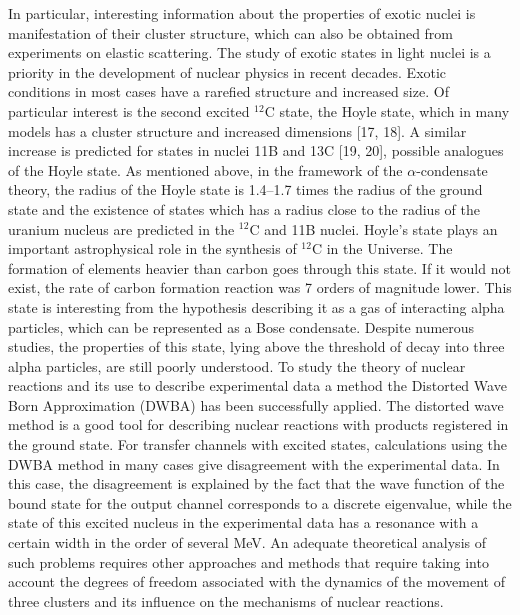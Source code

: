 \documentclass[
12pt, %
oneside, %
english, %
onehalfspacing, %
onehalfspacing, %
headsepline, %
]{MastersDoctoralThesis} %
\begin{document}
In particular, interesting information about the properties of exotic nuclei is manifestation of their cluster structure, which can also be obtained from experiments on elastic scattering. The study of exotic states in light nuclei is a priority in the development of nuclear physics in recent decades. Exotic conditions in most cases have a rarefied structure and increased size. Of particular interest is the second excited $^{12}$C state, the Hoyle state, which in many models has a cluster structure and increased dimensions [17, 18]. A similar increase is predicted for states in nuclei 11B and 13C [19, 20], possible analogues of the Hoyle state. As mentioned above, in the framework of the $\alpha$-condensate theory, the radius of the Hoyle state is 1.4–1.7 times the radius of the ground state and the existence of states which has a radius close to the radius of the uranium nucleus are predicted in the $^{12}$C and 11B nuclei.
Hoyle's state plays an important astrophysical role in the synthesis of $^{12}$C in the Universe. The formation of elements heavier than carbon goes through this state. If it would not exist, the rate of carbon formation reaction was 7 orders of magnitude lower. This state is interesting from the hypothesis describing it as a gas of interacting alpha particles, which can be represented as a Bose condensate. Despite numerous studies, the properties of this state, lying above the threshold of decay into three alpha particles, are still poorly understood.
To study the theory of nuclear reactions and its use to describe experimental data a method the Distorted Wave Born Approximation (DWBA) has been successfully applied. The distorted wave method is a good tool for describing nuclear reactions with products registered in the ground state. For transfer channels with excited states, calculations using the DWBA method in many cases give disagreement with the experimental data. In this case, the disagreement is explained by the fact that the wave function of the bound state for the output channel corresponds to a discrete eigenvalue, while the state of this excited nucleus in the experimental data has a resonance with a certain width in the order of several MeV. An adequate theoretical analysis of such problems requires other approaches and methods that require taking into account the degrees of freedom associated with the dynamics of the movement of three clusters and its influence on the mechanisms of nuclear reactions.
\end{document}
